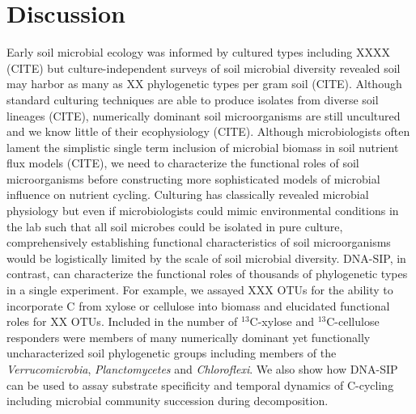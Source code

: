 \section{Discussion}
Early soil microbial ecology was informed by cultured types including XXXX
(CITE) but culture-independent surveys of soil microbial diversity revealed
soil may harbor as many as XX phylogenetic types per gram soil (CITE). Although
standard culturing techniques are able to produce isolates from diverse soil
lineages (CITE), numerically dominant soil microorganisms are still uncultured
and we know little of their ecophysiology (CITE). Although microbiologists
often lament the simplistic single term inclusion of microbial biomass in soil
nutrient flux models (CITE), we need to characterize the functional roles of
soil microorganisms before constructing more sophisticated models of microbial
influence on nutrient cycling. Culturing has classically revealed microbial
physiology but even if microbiologists could mimic environmental conditions in
the lab such that all soil microbes could be isolated in pure culture,
comprehensively establishing functional characteristics of soil microorganisms
would be logistically limited by the scale of soil microbial diversity.
DNA-SIP, in contrast, can characterize the functional roles of thousands of
phylogenetic types in a single experiment. For example, we assayed XXX
OTUs for the ability to incorporate C from xylose or cellulose into biomass and
elucidated functional roles for XX OTUs. Included in the number of
$^{13}$C-xylose and $^{13}$C-cellulose responders were members of many
numerically dominant yet functionally uncharacterized soil phylogenetic groups
including members of the \textit{Verrucomicrobia}, \textit{Planctomycetes} and
\textit{Chloroflexi}. We also show how DNA-SIP can be used to assay substrate
specificity and temporal dynamics of C-cycling including microbial community
succession during decomposition.

